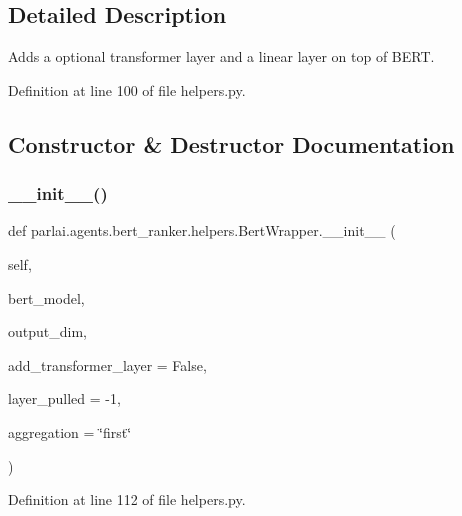 \subsection{Detailed Description}
\begin{DoxyVerb}Adds a optional transformer layer and a linear layer on top of BERT.
\end{DoxyVerb}
 

Definition at line 100 of file helpers.\+py.



\subsection{Constructor \& Destructor Documentation}
\mbox{\label{classparlai_1_1agents_1_1bert__ranker_1_1helpers_1_1BertWrapper_ad21b2bd2d710a64477265cf882f6c79a}} 
\subsubsection{\texorpdfstring{\+\_\+\+\_\+init\+\_\+\+\_\+()}{\_\_init\_\_()}}
{\footnotesize\ttfamily def parlai.\+agents.\+bert\+\_\+ranker.\+helpers.\+Bert\+Wrapper.\+\_\+\+\_\+init\+\_\+\+\_\+ (\begin{DoxyParamCaption}\item[{}]{self,  }\item[{}]{bert\+\_\+model,  }\item[{}]{output\+\_\+dim,  }\item[{}]{add\+\_\+transformer\+\_\+layer = {\ttfamily False},  }\item[{}]{layer\+\_\+pulled = {\ttfamily -\/1},  }\item[{}]{aggregation = {\ttfamily \char`\"{}first\char`\"{}} }\end{DoxyParamCaption})}



Definition at line 112 of file helpers.\+py.


